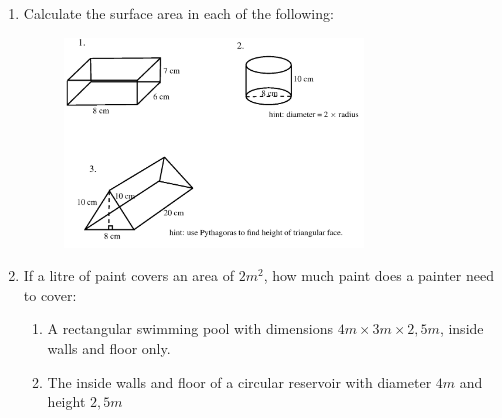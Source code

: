         \label{m39357*id62786}\begin{enumerate}[noitemsep, label=\textbf{\arabic*}. ] 
            \label{m39357*uid12}\item Calculate the surface area in each of the following:

    \setcounter{subfigure}{0}


	\begin{figure}[H] %
    \begin{center}
    \label{m39357*id62804!!!underscore!!!media}\label{m39357*id62804!!!underscore!!!printimage}\includegraphics[width=300px]{col11306.imgs/m39357_MG10C14_003.png} %
        
      \vspace{2pt}
    \vspace{.1in}
    
    \end{center}

 \end{figure}   

    \addtocounter{footnote}{-0}
            \label{m39357*uid13}\item  If a litre of paint covers an area of $2{m}^{2}$, how much paint does a painter need to cover:
\label{m39357*id62841}\begin{enumerate}[noitemsep, label=\textbf{\alph*}. ] 
            \label{m39357*uid14}\item A rectangular swimming pool with dimensions $4m\ensuremath{\times}3m\ensuremath{\times}2,5m$, inside walls and floor only.
\label{m39357*uid15}\item The inside walls and floor
of a circular reservoir with diameter $4m$ and height \begin{math}2,5m\end{math}\end{enumerate}
        
    \setcounter{subfigure}{0}



\end{enumerate}
